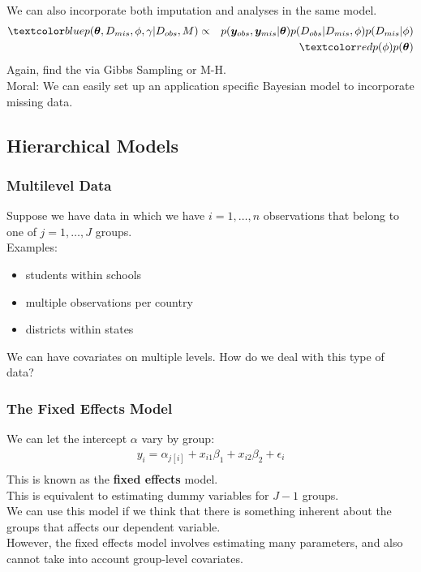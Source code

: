 \documentclass[handout]{beamer}
\begin{document}
\begin{frame}
We can also incorporate both imputation and analyses in the same model.
\begin{eqnarray*}
\blue{p(\bm{\theta}, D_{mis}, \phi, \gamma | D_{obs}, M)} &\propto&
p(\bm{y}_{obs}, \bm{y}_{mis} | \bm{\theta}) p(D_{obs}| D_{mis}
, \phi)p(D_{mis}|\phi) \\
&\phantom{\propto}&  \red{p(\phi) p(\bm{\theta})}\\
\end{eqnarray*}
\pause
Again, find the  via Gibbs Sampling or M-H. \\
\bigskip
\pause
Moral: We can easily set up an application specific Bayesian model to
incorporate missing data.
\end{frame}

\subsection{Hierarchical Models}

\begin{frame}
\frametitle{Multilevel Data}
\pause
Suppose we have data in which we have $i = 1, \dots, n$ observations
that belong to one of $j = 1, \dots, J$ groups. \\
\pause
\bigskip
Examples:
\pause 
\begin{itemize}
\item students within schools
\pause
\item multiple observations per country
\pause
\item districts within states
\end{itemize}
\pause
\bigskip
We can have covariates on multiple levels.  \pause How do we deal with this
type of data?
\end{frame}

\begin{frame}
\frametitle{The Fixed Effects Model}
\pause
We can let the intercept $\alpha$ vary by group:
\pause
\begin{eqnarray*}
y_i = \alpha_{j[i]} + x_{i1} \beta_1 + x_{i2} \beta_2 + \epsilon_i\\
\end{eqnarray*}
\pause
\bigskip
This is known as the {\bf fixed effects} model.  \\
\pause
\bigskip
This is equivalent to estimating dummy variables for $J-1$ groups. \\
\pause
\bigskip
We can use this model if we think that there is something inherent about the
groups that affects our dependent variable. \\
\pause
\bigskip
However, the fixed effects model involves estimating many parameters,
and also cannot take into account group-level covariates.
\end{frame}
\end{document}

